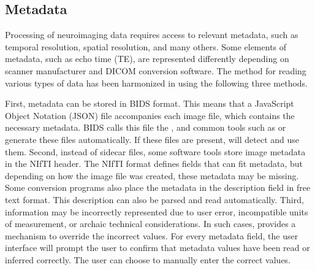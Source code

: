 \subsection{Metadata}

Processing of neuroimaging data requires access to relevant metadata, such as temporal resolution, spatial resolution, and many others. Some elements of metadata, such as echo time (TE), are represented differently depending on scanner manufacturer and DICOM conversion software. The method for reading various types of data has been harmonized in  using the following three methods.

First, metadata can be stored in BIDS format. This means that a JavaScript Object Notation (JSON) file accompanies each image file, which contains the necessary metadata. BIDS calls this file the , and common tools such as  \parencite{halchenko2018} or  \parencite{li2016} generate these files automatically. If these files are present,  will detect and use them. Second, instead of sidecar files, some software tools store image metadata in the NIfTI header. The NIfTI format defines fields that can fit metadata, but depending on how the image file was created, these metadata may be missing. Some conversion programs also place the metadata in the description field in free text format. This description can also be parsed and read automatically. Third, information may be incorrectly represented due to user error, incompatible units of measurement, or archaic technical considerations. In such cases,  provides a mechanism to override the incorrect values. For every metadata field, the user interface will prompt the user to confirm that metadata values have been read or inferred correctly. The user can choose to manually enter the correct values.
